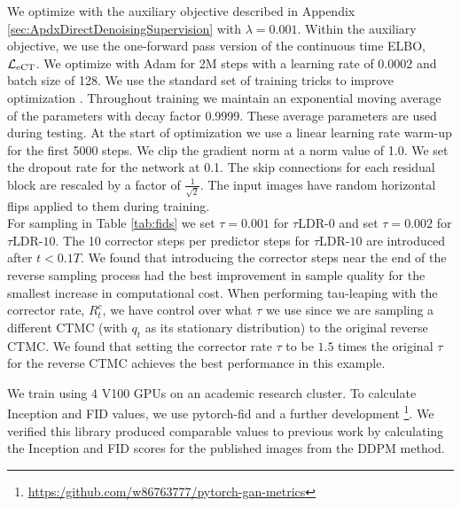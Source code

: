 \documentclass{article}
\begin{document}
We optimize with the auxiliary objective described in Appendix \ref{sec:ApdxDirectDenoisingSupervision} with $\lambda = 0.001$. Within the auxiliary objective, we use the one-forward pass version of the continuous time ELBO, $\mathcal{L}_{\textup{eCT}}$. We optimize with Adam for 2M steps with a learning rate of 0.0002 and batch size of 128. We use the standard set of training tricks to improve optimization \cite{ho2020denoising, song2020score}. Throughout training we maintain an exponential moving average of the parameters with decay factor 0.9999. These average parameters are used during testing. At the start of optimization we use a linear learning rate warm-up for the first 5000 steps. We clip the gradient norm at a norm value of 1.0. We set the dropout rate for the network at 0.1. The skip connections for each residual block are rescaled by a factor of $\frac{1}{\sqrt{2}}$. The input images have random horizontal flips applied to them during training.\\

For sampling in Table \ref{tab:fids} we set $\tau=0.001$ for $\tau$LDR-$0$ and set $\tau=0.002$ for $\tau$LDR-$10$. The 10 corrector steps per predictor steps for $\tau$LDR-$10$ are introduced after $t < 0.1T$. We found that introducing the corrector steps near the end of the reverse sampling process had the best improvement in sample quality for the smallest increase in computational cost. When performing tau-leaping with the corrector rate, $R_t^c$, we have control over what $\tau$ we use since we are sampling a different CTMC (with $q_t$ as its stationary distribution) to the original reverse CTMC. We found that setting the corrector rate $\tau$ to be $1.5$ times the original $\tau$ for the reverse CTMC achieves the best performance in this example.


We train using 4 V100 GPUs on an academic research cluster. To calculate Inception and FID values, we use pytorch-fid \cite{Seitzer2020FID} and a further development \footnote{\url{https:/github.com/w86763777/pytorch-gan-metrics}}. We verified this library produced comparable values to previous work by calculating the Inception and FID scores for the published images from the DDPM \cite{ho2020denoising} method.\\
\end{document}
